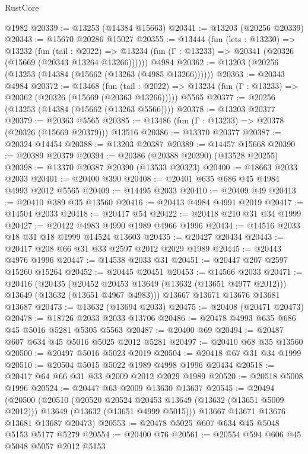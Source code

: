 \begin{lexlean}{RustCore}
\begin{coremodule}
    @1982
@20339 := @13253 (@14384 @15663)
@20341 := @13203 (@20256 @20339)
@20343 := @15670 @20286 @15027
@20355 := @13444
    (fun (lets : @13230) =>
    @13232
      (fun (tail : @2022) =>
      @13234 (fun (Γ : @13233) => @20341 (@20326 (@15669 (@20343 @13264 @13266))))))
    @4984
@20362 := @13203 (@20256 (@13253 (@14384 (@15662 (@13263 (@4985 @13266))))))
@20363 := @20343 @4984
@20372 := @13468
    (fun (tail : @2022) => @13234 (fun (Γ : @13233) => @20362 (@20326 (@15669 (@20363 @13266)))))
    @5565
@20377 := @20256 (@13253 (@14384 (@15662 (@13263 @5566))))
@20378 := @13203 @20377
@20379 := @20363 @5565
@20385 := @13486 (fun (Γ : @13233) => @20378 (@20326 (@15669 @20379))) @13516
@20386 := @13370 @20377
@20387 := @20324 @14454
@20388 := @13203 @20387
@20389 := @14457 @15668
@20390 := @20389 @20379
@20394 := @20386 (@20388 @20390) (@13528 @20255)
@20398 := @13370 @20387 @20390 (@13533 @20323)
@20400 := @18663 @2033 @2033
@20401 := @20400 @390
@20408 := @20401 @635 @686 @45 @4984 @4993 @2012 @5565
@20409 := @14495 @2033
@20410 := @20409 @49
@20413 := @20410 @389 @35 @13560
@20416 := @20413 @4984 @4991 @2019
@20417 := @14504 @2033
@20418 := @20417 @54
@20422 := @20418 @210 @31 @34 @1999
@20427 := @20422 @4983 @4990 @1989 @4966 @1996
@20434 := @14516 @2033 @18 @31 @18 @1999 @14524 @13603
@20435 := @20427 @20434
@20443 := @20417 @208 @66 @31 @33 @2597 @2012 @2029 @1989
@20445 := @20443 @4976 @1996
@20447 := @14538 @2033 @31
@20451 := @20447 @207 @2597 @15260 @15264
@20452 := @20445 @20451
@20453 := @14566 @2033
@20471 := @20416
    (@20435
      (@20452 @20453 @13649 (@13632 (@13651 @4977 @2012)))
      @13649
      (@13632 (@13651 @4967 @4983)))
    @13667
    @13671
    @13676
    @13681
    @13687
@20473 := @13632 (@13694 @2033)
@20475 := @20408 (@20471 @20473)
@20478 := @18726 @2033 @2033 @13706
@20486 := @20478 @4993 @635 @686 @45 @5016 @5281 @5305 @5563
@20487 := @20400 @69
@20494 := @20487 @607 @634 @45 @5016 @5025 @2012 @5281
@20497 := @20410 @68 @35 @13560
@20500 := @20497 @5016 @5023 @2019
@20504 := @20418 @67 @31 @34 @1999
@20510 := @20504 @5015 @5022 @1989 @4998 @1996 @20434
@20518 := @20417 @64 @66 @31 @33 @2009 @2012 @2029 @1989
@20520 := @20518 @5008 @1996
@20524 := @20447 @63 @2009 @13630 @13637
@20545 := @20494
    (@20500
      (@20510
        (@20520 @20524 @20453 @13649 (@13632 (@13651 @5009 @2012)))
        @13649
        (@13632 (@13651 @4999 @5015)))
      @13667
      @13671
      @13676
      @13681
      @13687
      @20473)
@20553 := @20478 @5025 @607 @634 @45 @5048 @5153 @5177 @5279
@20554 := @20400 @76
@20561 := @20554 @594 @606 @45 @5048 @5057 @2012 @5153

\end{coremodule}
\end{lexlean}
